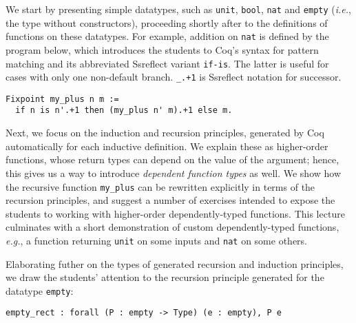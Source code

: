 \documentclass[blockstyle,preprint]{sigplanconf}
\newcommand{\code}[1]{\lstinline{#1}}
\newcommand{\ie}{\emph{i.e.}\xspace}
\newcommand{\eg}{\emph{e.g.}\xspace}
\begin{document}
We start by presenting simple datatypes, such as \code{unit},
\code{bool}, \code{nat} and \code{empty} (\ie, the type without
constructors), proceeding shortly after to the definitions of
functions on these datatypes. For example, addition on \code{nat} is
defined by the program below, which introduces the students to Coq's
syntax for pattern matching and its abbreviated Ssreflect variant
\code{if-is}. The latter is useful for cases with only one non-default
branch. \code{_.+1} is Ssreflect notation for successor.

\begin{lstlisting}
Fixpoint my_plus n m := 
  if n is n'.+1 then (my_plus n' m).+1 else m.
\end{lstlisting}

Next, we focus on the induction and recursion principles, generated by
Coq automatically for each inductive definition. We explain these as
higher-order functions, whose return types can depend on the value of
the argument; hence, this gives us a way to introduce \emph{dependent
  function types} as well. We show how the recursive function
\code{my_plus} can be rewritten explicitly in terms of the recursion
principles, and suggest a number of exercises intended to expose the
students to working with higher-order dependently-typed
functions. This lecture culminates with a short demonstration of
custom dependently-typed functions, \eg, a function returning
\code{unit} on some inputs and \code{nat} on some others.

Elaborating futher on the types of generated recursion and induction
principles, we draw the students' attention to the recursion principle
generated for the datatype \code{empty}:

\begin{lstlisting}
empty_rect : forall (P : empty -> Type) (e : empty), P e
\end{lstlisting}
\end{document}
